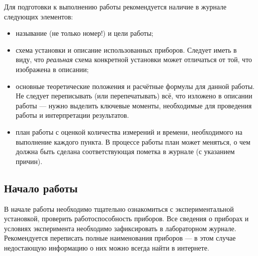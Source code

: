 Для подготовки к выполнению работы рекомендуется наличие в журнале следующих
элементов:
\begin{itemize}
    \item называние (не только номер!) и цели работы;

    \item схема установки и описание использованных приборов.
    Следует иметь в виду, что \emph{реальная} схема конкретной установки
    может отличаться от той, что изображена в описании;

    \item основные теоретические положения и расчётные формулы для данной работы.
    Не следует переписывать (или перепечатывать) всё, что изложено в описании
    работы --- нужно выделить ключевые моменты, необходимые для
    проведения работы и интерпретации результатов.

    \item план работы с оценкой количества измерений и времени, необходимого на
выполнение каждого пункта.
В процессе работы план может меняться, о чем должна
быть сделана соответствующая пометка в журнале (с указанием причин).

\end{itemize}

\subsection{Начало работы}

В начале работы необходимо тщательно ознакомиться с экспериментальной
установкой, проверить работоспособность приборов. Все сведения о приборах
и условиях эксперимента необходимо
зафиксировать в лабораторном журнале. Рекомендуется переписать полные наименования
приборов --- в этом случае недостающую информацию о них можно всегда найти в интернете.





